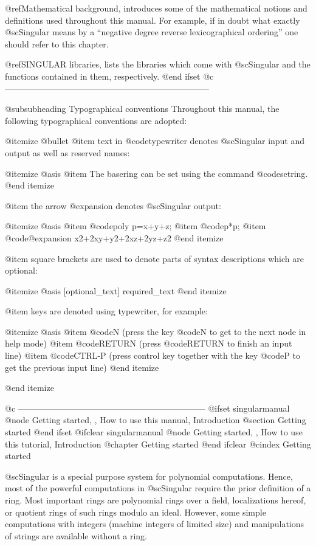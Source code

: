 @ref{Mathematical background}, introduces some of the mathematical
notions and definitions used throughout this manual.  For example, if in
doubt what exactly @sc{Singular} means by a ``negative degree reverse
lexicographical ordering'' one should refer to this chapter.

@ref{SINGULAR libraries}, lists the
libraries which come with @sc{Singular} and the functions contained in
them, respectively.
@end ifset
@c ------------------------------------------------------------------------

@subsubheading Typographical conventions
Throughout this manual, the following typographical conventions are
adopted:

@itemize @bullet
@item
text in @code{typewriter} denotes @sc{Singular} input and output as well
as reserved names:

@itemize @asis
@item The basering can be set using the command @code{setring}.
@end itemize

@item
the arrow @expansion{} denotes @sc{Singular} output:

@itemize @asis
@item @code{poly p=x+y+z;}
@item @code{p*p;}
@item @code{@expansion{} x2+2xy+y2+2xz+2yz+z2}
@end itemize

@item
square brackets are used to denote parts of syntax descriptions which
are optional:

@itemize @asis
[optional_text] required_text
@end itemize

@item
keys are denoted using typewriter, for example:

@itemize @asis
@item @code{N} (press the key @code{N} to get to the next node in help
mode)
@item @code{RETURN} (press @code{RETURN} to finish an input line)
@item @code{CTRL-P} (press control key together with the key @code{P} to
get the previous input line)
@end itemize

@end itemize

@c ------------------------------------------------------------------
@ifset singularmanual
@node Getting started,  , How to use this manual, Introduction
@section Getting started
@end ifset
@ifclear singularmanual
@node Getting started,  , How to use this tutorial, Introduction
@chapter Getting started
@end ifclear
@cindex Getting started

@sc{Singular} is a special purpose system for polynomial
computations. Hence, most of the powerful computations in @sc{Singular}
require the prior definition of a ring. Most important rings are
polynomial rings over a field, localizations hereof, or quotient rings of
such rings modulo an ideal. However, some simple computations with
integers (machine integers of limited size) and manipulations of strings
are available without a ring.

